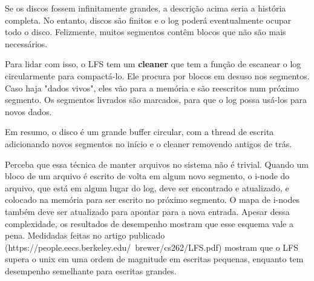 \documentclass{article}
\begin{document}
Se os discos fossem infinitamente grandes, a descrição acima seria a história completa. No entanto, discos são finitos e o log poderá eventualmente ocupar todo o disco. Felizmente, muitos segmentos contêm blocos que não são mais necessários.

Para lidar com isso, o LFS tem um \textbf{cleaner} que tem a função de escanear o log circularmente para compactá-lo. Ele procura por blocos em desuso nos segmentos. Caso haja "dados vivos", eles vão para a memória e são reescritos num próximo segmento. Os segmentos livrados são marcados, para que o log possa usá-los para novos dados.

Em resumo, o disco é um grande buffer circular, com a thread de escrita adicionando novos segmentos no início e o cleaner removendo antigos de trás.

Perceba que essa técnica de manter arquivos no sistema não é trivial. Quando um bloco de um arquivo é escrito de volta em algum novo segmento, o i-node do arquivo, que está em algum lugar do log, deve ser encontrado e atualizado, e colocado na memória para ser escrito no próximo segmento. O mapa de i-nodes também deve ser atualizado para apontar para a nova entrada. Apesar dessa complexidade, os resultados de desempenho mostram que esse esquema vale a pena. Medidadas feitas no artigo publicado (https://people.eecs.berkeley.edu/~brewer/cs262/LFS.pdf) mostram que o LFS supera o unix em uma ordem de magnitude em escritas pequenas, enquanto tem desempenho semelhante para escritas grandes.
\end{document}
